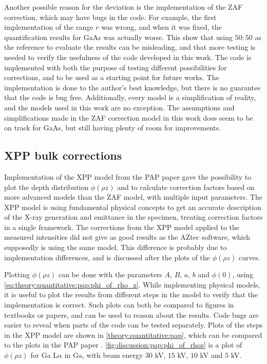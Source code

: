 Another possible reason for the deviation is the implementation of the ZAF correction, which may have bugs in the code.
For example, the first implementation of the range $r$ was wrong, and when it was fixed, the quantification results for GaAs was actually worse.
This show that using $50:50$ as the reference to evaluate the results can be misleading, and that more testing is needed to verify the usefulness of the code developed in this work.
The code is implemented with both the purpose of testing different possibilities for corrections, and to be used as a starting point for future works.
The implementation is done to the author's best knowledge, but there is no guarantee that the code is bug free.
Additionally, every model is a simplification of reality, and the models used in this work are no exception.
The assumptions and simplifications made in the ZAF correction model in this work does seem to be on track for GaAs, but still having plenty of room for improvements.








\subsection{XPP bulk corrections}
\label{discussion:quantitative:xpp}

Implementation of the XPP model from the PAP paper \cite{pap_1991} gave the possibility to plot the depth distribution $\phi(\rho z)$ and to calculate correction factors based on more advanced models than the ZAF model, with multiple input parameters.
The XPP model is using fundamental physical concepts to get an accurate description of the X-ray generation and emittance in the specimen, treating correction factors in a single framework.
The corrections from the XPP model applied to the measured intensities did not give as good results as the AZtec software, which supposedly is using the same model.
This difference is probably due to implementation differences, and is discussed after the plots of the $\phi(\rho z)$ curves.

Plotting $\phi(\rho z)$ can be done with the parameters $A$, $B$, $a$, $b$ and $\phi(0)$, using \cref{eq:theory:quantitative:pap:phi_of_rho_z}.
While implementing physical models, it is useful to plot the results from different steps in the model to verify that the implementation is correct.
Such plots can both be compared to figures in textbooks or papers, and can be used to reason about the results.
Code bugs are easier to reveal when parts of the code can be tested separately.
Plots of the steps in the XPP model are shown in \cref{theory:quantitative:pap}, which can be compared to the plots in the PAP paper \cite{pap_1991}.
\cref{fig:discussion:pap:phi_of_rhoz} is a plot of $\phi(\rho z)$ for Ga L$\alpha$ in Ga, with beam energy $30$ kV, $15$ kV, $10$ kV and $5$ kV.


